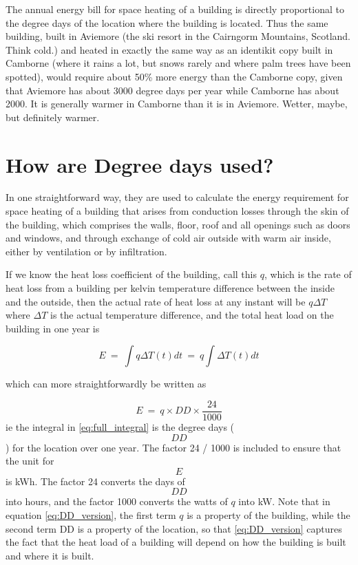 \documentclass{article}
\begin{document}
The annual energy  bill for space heating of a building is directly proportional to the degree days of the location where the building is located. Thus the same building, built in Aviemore (the ski resort in the Cairngorm Mountains, Scotland. Think cold.) and heated in exactly the same way as an identikit copy built in Camborne (where it rains a lot, but snows rarely and where palm trees have been spotted), would require about 50\% more energy than the Camborne copy, given that Aviemore has about 3000 degree days per year while Camborne has about 2000. It is generally warmer in Camborne than it is in Aviemore. Wetter, maybe, but definitely warmer.

\section{How are Degree days used?}

In one straightforward way, they are used to calculate the energy requirement for space heating of a building that arises from conduction losses through the skin of the building, which comprises the walls, floor, roof and all openings such as doors and windows, and through exchange of cold air outside with warm air inside, either by ventilation or by infiltration.

If we know the heat loss coefficient of the building, call this $q$, which is the rate of heat loss from a building per kelvin temperature difference between the inside and the outside, then the actual rate of heat loss at any instant will be $q\Delta T$ where $\Delta T$ is the actual temperature difference, and the total heat load on the building in one year is

\begin{equation}
E\ =\ \int{q \Delta T(t) dt}\ =\ q\int{\Delta T(t) dt}
\label{eq:full_integral}
\end{equation}
 
which can more straightforwardly be written as

\begin{equation}
E\ =\ q\times DD\times\frac{24}{1000}
\label{eq:DD_version}
\end{equation} 
ie the integral in \ref{eq:full_integral} is the degree days ($$DD$$) for the location over one year. The factor 24 / 1000 is included to ensure that the unit for $$E$$ is kWh. The factor 24 converts the days of $$DD$$ into hours, and the factor 1000 converts the watts of $q$ into kW.
Note that in equation \ref{eq:DD_version}, the first term $q$ is a property of the building, while the second term DD is a property of the location, so that \ref{eq:DD_version} captures the fact that the heat load of a building will depend on how the building is built and where it is built.
\end{document}
